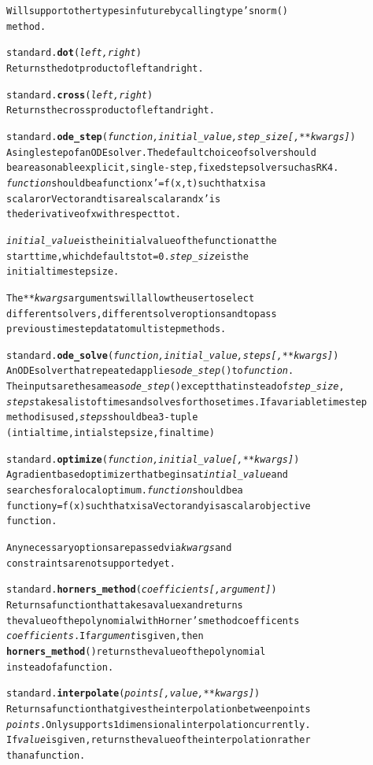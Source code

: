 \documentclass{book}
\begin{document}
\begin{alltt}
    Will support other types in future by calling type's norm()
    method.

standard.\textbf{dot}(\emph{ left,right})
    Returns the dot product of left and right.

standard.\textbf{cross}(\emph{ left,right})
    Returns the cross product of left and right.

standard.\textbf{ode_step}(\emph{function, initial_value, step_size[, **kwargs]})
    A single step of an ODE solver. The default choice of solver should 
    be a reasonable explicit, single-step, fixed step solver such as RK4. 
    \emph{function} should be a  function x'=f( x,t ) such that x is a 
    scalar or Vector and t is a real scalar and x' is
    the derivative of x with respect to t.

    \emph{initial_value} is the initial value of the function at the
     start time, which defaults to t=0. \emph{step_size} is the 
     initial time step size. 

    The \emph{**kwargs} arguments will allow the user to select
    different solvers, different solver options and to pass 
    previous time step data to multistep methods.

standard.\textbf{ode_solve}(\emph{function, initial_value, steps[, **kwargs]})
    An ODE solver that repeated applies \emph{ode_step}() to \emph{function}.
    The inputs are the same as \emph{ode_step}() except that instead of \emph{step_size},
    \emph{steps} takes a list of times and solves for those times. If a variable time step 
    method is used, \emph{steps} should be a 3-tuple 
    (intial time, intial step size, final time)

standard.\textbf{optimize}(\emph{function, initial_value[, **kwargs]})
    A gradient based optimizer that begins at \emph{intial_value} and 
    searches for a local optimum. \emph{function} should be a
    function y=f( x ) such that x is a Vector and y is a scalar objective 
    function.

    Any necessary options are passed via \emph{kwargs} and
    constraints are not supported yet.

standard.\textbf{horners_method}(\emph{coefficients[, argument]})
    Returns a function that takes a value x and returns 
    the value of the polynomial with Horner's method coefficents
    \emph{coefficients}. If \emph{argument} is given, then 
    \textbf{horners_method}() returns the value of the polynomial
    instead of a function.

standard.\textbf{interpolate}(\emph{points [, value, **kwargs ]} )
    Returns a function that gives the interpolation between points
    \emph{points}. Only supports 1 dimensional interpolation currently.
    If \emph{value} is given, returns the value of the interpolation rather
    than a function.


\end{alltt}
\end{document}
